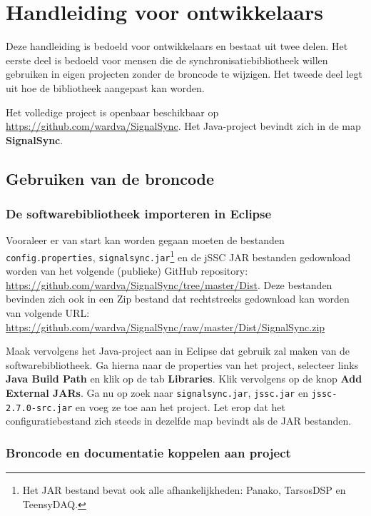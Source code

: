 \chapter{Handleiding voor ontwikkelaars}
\label{appendix-e}

Deze handleiding is bedoeld voor ontwikkelaars en bestaat uit twee delen. Het eerste deel is bedoeld voor mensen die de synchronisatiebibliotheek willen gebruiken in eigen projecten zonder de broncode te wijzigen. Het tweede deel legt uit hoe de bibliotheek aangepast kan worden.

Het volledige project is openbaar beschikbaar op \url{https://github.com/wardva/SignalSync}. Het Java-project bevindt zich in de map \textbf{SignalSync}.

\section{Gebruiken van de broncode}

\subsection*{De softwarebibliotheek importeren in Eclipse}

Vooraleer er van start kan worden gegaan moeten de bestanden \texttt{config.properties}, \texttt{signalsync.jar}\footnote{Het JAR bestand bevat ook alle afhankelijkheden: Panako\cite{six2014panako}, TarsosDSP\cite{six2014tarsosdsp} en TeensyDAQ.} en de jSSC JAR bestanden gedownload worden van het volgende (publieke) GitHub repository: \url{https://github.com/wardva/SignalSync/tree/master/Dist}. Deze bestanden bevinden zich ook in een Zip bestand dat rechtstreeks gedownload kan worden van volgende URL: \url{https://github.com/wardva/SignalSync/raw/master/Dist/SignalSync.zip}

Maak vervolgens het Java-project aan in Eclipse dat gebruik zal maken van de softwarebibliotheek. Ga hierna naar de properties van het project, selecteer links \textbf{Java Build Path} en klik op de tab \textbf{Libraries}. Klik vervolgens op de knop \textbf{Add External JARs}. Ga nu op zoek naar \texttt{signalsync.jar}, \texttt{jssc.jar} en \texttt{jssc-2.7.0-src.jar} en voeg ze toe aan het project. Let erop dat het configuratiebestand zich steeds in dezelfde map bevindt als de JAR bestanden.

\subsection*{Broncode en documentatie koppelen aan project}

